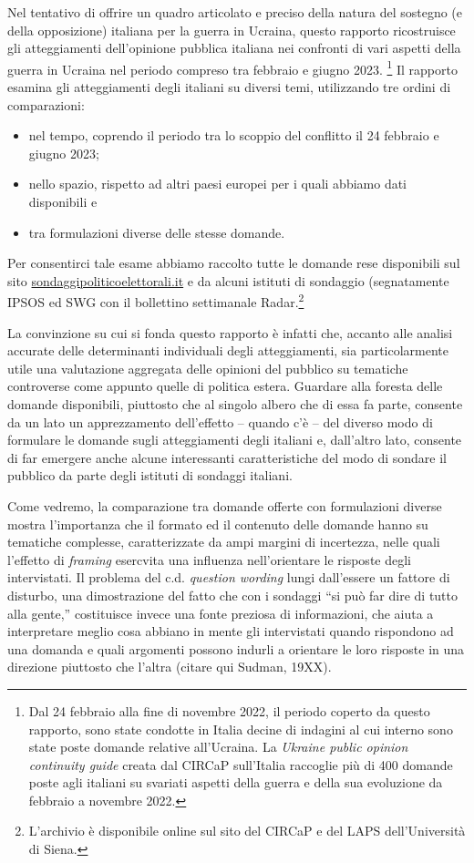 \documentclass[
]{book}
\begin{document}
Nel tentativo di offrire un quadro articolato e preciso della natura del sostegno (e della opposizione) italiana per la guerra in Ucraina, questo rapporto ricostruisce gli atteggiamenti dell'opinione pubblica italiana nei confronti di vari aspetti della guerra in Ucraina nel periodo compreso tra febbraio e giugno 2023. \footnote{Dal 24 febbraio alla fine di novembre 2022, il periodo coperto da questo rapporto, sono state condotte in Italia decine di indagini al cui interno sono state poste domande relative all'Ucraina. La \emph{Ukraine public opinion continuity guide} creata dal CIRCaP sull'Italia raccoglie più di 400 domande poste agli italiani su svariati aspetti della guerra e della sua evoluzione da febbraio a novembre 2022.} Il rapporto esamina gli atteggiamenti degli italiani su diversi temi, utilizzando tre ordini di comparazioni:

\begin{itemize}
\item
  nel tempo, coprendo il periodo tra lo scoppio del conflitto il 24 febbraio e giugno 2023;
\item
  nello spazio, rispetto ad altri paesi europei per i quali abbiamo dati disponibili e
\item
  tra formulazioni diverse delle stesse domande.
\end{itemize}

Per consentirci tale esame abbiamo raccolto tutte le domande rese disponibili sul sito \href{http://www.sondaggipoliticoelettorali.it/}{sondaggipoliticoelettorali.it} e da alcuni istituti di sondaggio (segnatamente IPSOS ed SWG con il bollettino settimanale Radar.\footnote{L'archivio è disponibile online sul sito del CIRCaP e del LAPS dell'Università di Siena.}

La convinzione su cui si fonda questo rapporto è infatti che, accanto alle analisi accurate delle determinanti individuali degli atteggiamenti, sia particolarmente utile una valutazione aggregata delle opinioni del pubblico su tematiche controverse come appunto quelle di politica estera. Guardare alla foresta delle domande disponibili, piuttosto che al singolo albero che di essa fa parte, consente da un lato un apprezzamento dell'effetto -- quando c'è -- del diverso modo di formulare le domande sugli atteggiamenti degli italiani e, dall'altro lato, consente di far emergere anche alcune interessanti caratteristiche del modo di sondare il pubblico da parte degli istituti di sondaggi italiani.

Come vedremo, la comparazione tra domande offerte con formulazioni diverse mostra l'importanza che il formato ed il contenuto delle domande hanno su tematiche complesse, caratterizzate da ampi margini di incertezza, nelle quali l'effetto di \emph{framing} esercvita una influenza nell'orientare le risposte degli intervistati. Il problema del c.d. \emph{question wording} lungi dall'essere un fattore di disturbo, una dimostrazione del fatto che con i sondaggi ``si può far dire di tutto alla gente,'' costituisce invece una fonte preziosa di informazioni, che aiuta a interpretare meglio cosa abbiano in mente gli intervistati quando rispondono ad una domanda e quali argomenti possono indurli a orientare le loro risposte in una direzione piuttosto che l'altra (citare qui Sudman, 19XX).
\end{document}

